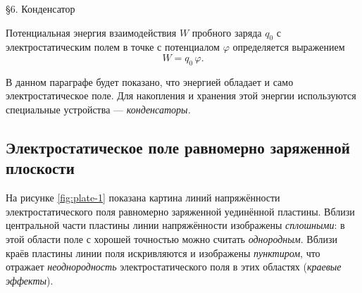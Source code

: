 \documentclass[14pt,a4paper,oneside]{extreport}
\theoremstyle{definition}
\newcommand{\name}[1]{%
  \begin{center}
    \vspace*{0.1cm}
    {\bfseries\fontsize{28}{32}\selectfont
      \parbox{\textwidth}{\centering #1\par}}%
  \end{center}%
}
\begin{document}
\pagestyle{empty}


\name{\S 6. Конденсатор}

Потенциальная энергия взаимодействия $W$ пробного заряда $q_0$ с электростатическим полем
в точке с потенциалом $\varphi$ определяется выражением
\begin{equation*}
  W = q_0\,\varphi.
\end{equation*}

В данном параграфе будет показано, что энергией обладает и само электростатическое поле. Для накопления и хранения этой энергии используются специальные устройства — \textit{конденсаторы.}
\subsection*{Электростатическое поле равномерно заряженной плоскости}

На рисунке \ref{fig:plate-1} показана картина линий напряжённости электростатического поля равномерно заряженной уединённой пластины.
Вблизи центральной части пластины линии напряжённости изображены \textit{сплошными}: в этой области поле с хорошей точностью можно считать \textit{однородным}.
Вблизи краёв пластины линии поля искривляются и изображены \textit{пунктиром}, что отражает \textit{неоднородность} электростатического поля в этих областях (\textit{краевые эффекты}).
\end{document}

